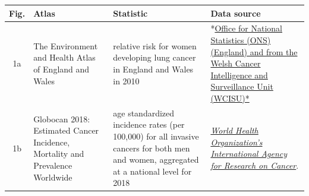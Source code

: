 \documentclass{monashthesis}
\begin{document}
\begin{longtable}[]{@{}clll@{}}
\toprule
\begin{minipage}[b]{0.08\columnwidth}\centering
Fig.\strut
\end{minipage} & \begin{minipage}[b]{0.20\columnwidth}\raggedright
Atlas\strut
\end{minipage} & \begin{minipage}[b]{0.35\columnwidth}\raggedright
Statistic\strut
\end{minipage} & \begin{minipage}[b]{0.26\columnwidth}\raggedright
Data source\strut
\end{minipage}\tabularnewline
\midrule
\endhead
\begin{minipage}[t]{0.08\columnwidth}\centering
1a\strut
\end{minipage} & \begin{minipage}[t]{0.20\columnwidth}\raggedright
The Environment and Health Atlas of England and Wales\strut
\end{minipage} & \begin{minipage}[t]{0.35\columnwidth}\raggedright
relative risk for women developing lung cancer in England and Wales in 2010 \autocite{EnvEnglandWales2}\strut
\end{minipage} & \begin{minipage}[t]{0.26\columnwidth}\raggedright
*\href{http://www.envhealthatlas.co.uk/homepage/}{Office for National Statistics (ONS) (England) and from the Welsh Cancer Intelligence and Surveillance Unit (WCISU)*}\strut
\end{minipage}\tabularnewline
\begin{minipage}[t]{0.08\columnwidth}\centering
1b\strut
\end{minipage} & \begin{minipage}[t]{0.20\columnwidth}\raggedright
Globocan 2018: Estimated Cancer Incidence, Mortality and Prevalence Worldwide\strut
\end{minipage} & \begin{minipage}[t]{0.35\columnwidth}\raggedright
age standardized incidence rates (per 100,000) for all invasive cancers for both men and women, aggregated at a national level for 2018 \autocite{Globocan}\strut
\end{minipage} & \begin{minipage}[t]{0.26\columnwidth}\raggedright
\emph{\href{https://www.iarc.fr/}{World Health Organization's International Agency for Research on Cancer}}.\strut

\end{minipage}
\end{longtable}
\end{document}
